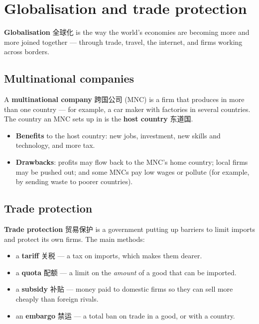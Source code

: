\documentclass[11pt]{article}
\begin{document}
\section*{Globalisation and trade protection}

\textbf{Globalisation} 全球化 is the way the world's economies are becoming more and more joined together — through trade, travel, the internet, and firms working across borders.

\subsection*{Multinational companies}

A \textbf{multinational company} 跨国公司 (MNC) is a firm that produces in more than one country — for example, a car maker with factories in several countries. The country an MNC sets up in is the \textbf{host country} 东道国.

\begin{itemize}
\item \textbf{Benefits} to the host country: new jobs, investment, new skills and technology, and more tax.

\item \textbf{Drawbacks}: profits may flow back to the MNC's home country; local firms may be pushed out; and some MNCs pay low wages or pollute (for example, by sending waste to poorer countries).

\end{itemize}

\subsection*{Trade protection}

\textbf{Trade protection} 贸易保护 is a government putting up barriers to limit imports and protect its own firms. The main methods:

\begin{itemize}
\item a \textbf{tariff} 关税 — a tax on imports, which makes them dearer.

\item a \textbf{quota} 配额 — a limit on the \emph{amount} of a good that can be imported.

\item a \textbf{subsidy} 补贴 — money paid to domestic firms so they can sell more cheaply than foreign rivals.

\item an \textbf{embargo} 禁运 — a total ban on trade in a good, or with a country.

\end{itemize}
\end{document}
